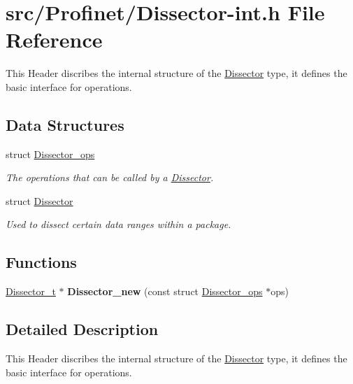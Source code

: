 \hypertarget{_dissector-int_8h}{}\section{src/\+Profinet/\+Dissector-\/int.h File Reference}
\label{_dissector-int_8h}


This Header discribes the internal structure of the \hyperlink{struct_dissector}{Dissector} type, it defines the basic interface for operations.  


\subsection*{Data Structures}
\begin{DoxyCompactItemize}
\item 
struct \hyperlink{struct_dissector__ops}{Dissector\+\_\+ops}
\begin{DoxyCompactList}\small\item\em The operations that can be called by a \hyperlink{struct_dissector}{Dissector}. \end{DoxyCompactList}\item 
struct \hyperlink{struct_dissector}{Dissector}
\begin{DoxyCompactList}\small\item\em Used to dissect certain data ranges within a package. \end{DoxyCompactList}\end{DoxyCompactItemize}
\subsection*{Functions}
\begin{DoxyCompactItemize}
\item 
\hypertarget{_dissector-int_8h_af20c51477bd3b35a08e9558f011367ae}{}\hyperlink{struct_dissector}{Dissector\+\_\+t} $\ast$ {\bfseries Dissector\+\_\+new} (const struct \hyperlink{struct_dissector__ops}{Dissector\+\_\+ops} $\ast$ops)\label{_dissector-int_8h_af20c51477bd3b35a08e9558f011367ae}

\end{DoxyCompactItemize}


\subsection{Detailed Description}
This Header discribes the internal structure of the \hyperlink{struct_dissector}{Dissector} type, it defines the basic interface for operations. 


